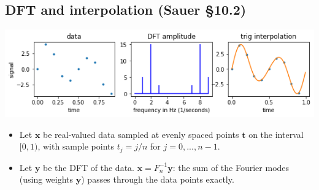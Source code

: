\documentclass[12pt,letterpaper,noanswers]{exam}
\newcommand{\vc}[1]{\boldsymbol{#1}}
\begin{document}
\subsection*{DFT and interpolation (Sauer \S 10.2)}
\includegraphics[width=0.9\linewidth]{img/C20interp.png}
\begin{tcolorbox}
\begin{itemize}
\itemsep0pt
    \item Let $\vc{x}$ be real-valued data sampled at evenly spaced points $\vc{t}$ on the interval $[0,1)$, with sample points $t_j = j/n$ for $j=0,...,n-1$.
    \item Let $\vc{y}$ be the DFT of the data.  $\vc{x} = F_n^{-1}\vc{y}$: the sum of the Fourier modes (using weights $\vc{y}$) passes through the data points exactly.
\end{itemize}
\end{tcolorbox}
\end{document}
